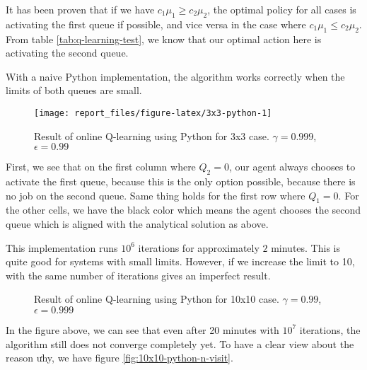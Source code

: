 \documentclass[
  a4paper, xcolor = usenames,dvipsnames]{article}
\theoremstyle{definition}
\theoremstyle{definition}
\theoremstyle{definition}
\theoremstyle{definition}
\theoremstyle{remark}
\begin{document}
It has been proven that if we have \(c_{1} \mu_{1} \ge c_{2} \mu_{2}\), the optimal policy for all cases is activating the first queue if possible, and vice versa in the case where \(c_{1} \mu_{1} \le c_{2} \mu_{2}\). From table \ref{tab:q-learning-test}, we know that our optimal action here is activating the second queue.

With a naive Python implementation, the algorithm works correctly when the limits of both queues are small.

\begin{figure}

{\centering \texttt{[image: report\_files/figure-latex/3x3-python-1]} 

}

\caption{Result of online Q-learning using Python for 3x3 case. $\gamma = 0.999$, $\epsilon = 0.99$}\label{fig:3x3-python}
\end{figure}

First, we see that on the first column where \(Q_{2} = 0\), our agent always chooses to activate the first queue, because this is the only option possible, because there is no job on the second queue. Same thing holds for the first row where \(Q_{1} = 0\). For the other cells, we have the black color which means the agent chooses the second queue which is aligned with the analytical solution as above.

This implementation runs \(10^6\) iterations for approximately \(2\) minutes. This is quite good for systems with small limits. However, if we increase the limit to 10, with the same number of iterations gives an imperfect result.

\begin{figure}

{\centering {}

}

\caption{Result of online Q-learning using Python for 10x10 case. $\gamma = 0.99$, $\epsilon = 0.999$}\label{fig:10x10-python}
\end{figure}

In the figure above, we can see that even after 20 minutes with \(10^7\) iterations, the algorithm still does not converge completely yet. To have a clear view about the reason ưhy, we have figure \ref{fig:10x10-python-n-visit}.
\end{document}
